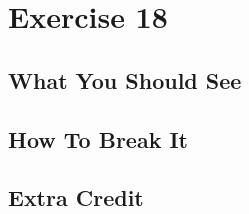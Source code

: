 \chapter{Exercise 18}


\section{What You Should See}


\section{How To Break It}


\section{Extra Credit}



